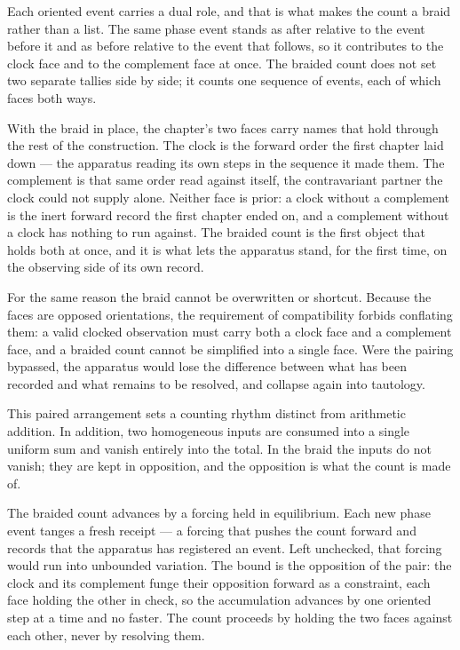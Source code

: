 Each oriented event carries a dual role, and that is what makes the count a braid rather than a list. The same phase event stands as after relative to the event before it and as before relative to the event that follows, so it contributes to the clock face and to the complement face at once. The braided count does not set two separate tallies side by side; it counts one sequence of events, each of which faces both ways.

With the braid in place, the chapter's two faces carry names that hold through the rest of the construction. The clock is the forward order the first chapter laid down --- the apparatus reading its own steps in the sequence it made them. The complement is that same order read against itself, the contravariant partner the clock could not supply alone. Neither face is prior: a clock without a complement is the inert forward record the first chapter ended on, and a complement without a clock has nothing to run against. The braided count is the first object that holds both at once, and it is what lets the apparatus stand, for the first time, on the observing side of its own record.

For the same reason the braid cannot be overwritten or shortcut. Because the faces are opposed orientations, the requirement of compatibility forbids conflating them: a valid clocked observation must carry both a clock face and a complement face, and a braided count cannot be simplified into a single face. Were the pairing bypassed, the apparatus would lose the difference between what has been recorded and what remains to be resolved, and collapse again into tautology.

This paired arrangement sets a counting rhythm distinct from arithmetic addition. In addition, two homogeneous inputs are consumed into a single uniform sum and vanish entirely into the total. In the braid the inputs do not vanish; they are kept in opposition, and the opposition is what the count is made of. 

The braided count advances by a forcing held in equilibrium. Each new phase event tanges a fresh receipt --- a forcing that pushes the count forward and records that the apparatus has registered an event. Left unchecked, that forcing would run into unbounded variation. The bound is the opposition of the pair: the clock and its complement funge their opposition forward as a constraint, each face holding the other in check, so the accumulation advances by one oriented step at a time and no faster. The count proceeds by holding the two faces against each other, never by resolving them. 

